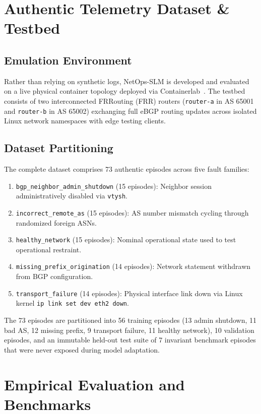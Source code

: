\documentclass[conference]{IEEEtran}
\begin{document}
\section{Authentic Telemetry Dataset \& Testbed}

\subsection{Emulation Environment}
Rather than relying on synthetic logs, NetOps-SLM is developed and evaluated on a live physical container topology deployed via Containerlab~\cite{containerlab2021}. The testbed consists of two interconnected FRRouting (FRR) routers (\texttt{router-a} in AS 65001 and \texttt{router-b} in AS 65002) exchanging full eBGP routing updates across isolated Linux network namespaces with edge testing clients.

\subsection{Dataset Partitioning}
The complete dataset comprises 73 authentic episodes across five fault families:
\begin{enumerate}
    \item \texttt{bgp\_neighbor\_admin\_shutdown} (15 episodes): Neighbor session administratively disabled via \texttt{vtysh}.
    \item \texttt{incorrect\_remote\_as} (15 episodes): AS number mismatch cycling through randomized foreign ASNs.
    \item \texttt{healthy\_network} (15 episodes): Nominal operational state used to test operational restraint.
    \item \texttt{missing\_prefix\_origination} (14 episodes): Network statement withdrawn from BGP configuration.
    \item \texttt{transport\_failure} (14 episodes): Physical interface link down via Linux kernel \texttt{ip link set dev eth2 down}.
\end{enumerate}
The 73 episodes are partitioned into 56 training episodes (13 admin shutdown, 11 bad AS, 12 missing prefix, 9 transport failure, 11 healthy network), 10 validation episodes, and an immutable held-out test suite of 7 invariant benchmark episodes that were never exposed during model adaptation.

\section{Empirical Evaluation and Benchmarks}
\end{document}
